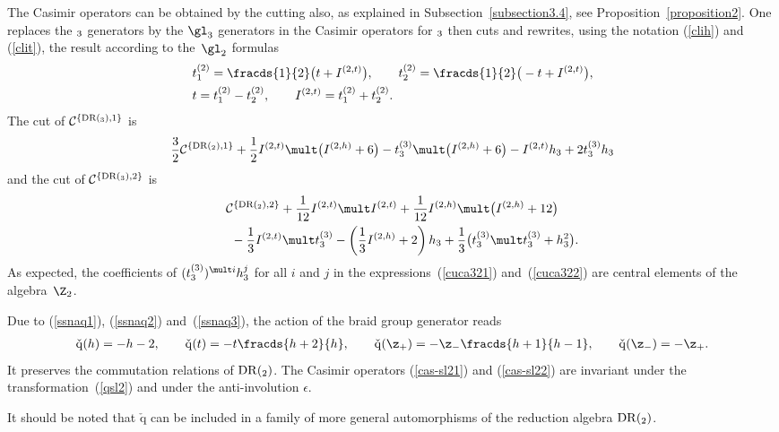 \documentclass[pdftex]{sigma}
\def\q{\check{\mathrm q}}\def\Q{\mathrm{Q}}\def\r#1{(\ref{#1})}\let\rf=\r
\numberwithin{equation}{section}
\begin{document}
The Casimir operators can be obtained by the cutting also, as explained in Subsection~\ref{subsection3.4}, see Proposition~\ref{proposition2}.
One replaces the  $\sl_3$ generators by the $\gl_3$ generators in the Casimir operators
for $\sl_3$ then cuts and rewrites, using the notation \rf{clih} and \rf{clit}, the result according to the~$\gl_2$ formulas
\begin{gather*}
\begin{split}
& t_1^{(2)}= \fracds{1}{2}\big(t +I^{(2,t)}\big)  ,\qquad t_2^{(2)}=  \fracds{1}{2}\big(-t +I^{(2,t)}\big)  ,\\
& t=t_1^{(2)}-t_2^{(2)} ,\qquad I^{(2,t)}=t_1^{(2)}+t_2^{(2)}  .
\end{split}
\end{gather*}
The cut of ${\mathcal{C}}^{\{ {\mathrm{DR}}(\sl_3),1\} }$ is
\begin{gather}
\frac{3}{2}{\mathcal{C}}^{\{ {\mathrm{DR}}(\sl_2),1\} } + \frac{1}{2}I^{(2,t)}\mult\bigl( I^{(2,h)}+6\bigr)
  -t_3^{(3)}\mult\bigl( I^{(2,h)}+6\bigr)-I^{(2,t)}h_3+2t_3^{(3)}h_3   \label{cuca321}
\end{gather}
and the cut of ${\mathcal{C}}^{\{ {\mathrm{DR}}(\sl_3),2\} }$ is
\begin{gather}
{\mathcal{C}}^{\{ {\mathrm{DR}}(\sl_2),2\} } + \frac{1}{12}I^{(2,t)}\mult I^{(2,t)}+ \frac{1}{12}{I^{(2,h)}}\mult\bigl( I^{(2,h)}+12\bigr)\nonumber\\
\qquad{} - \frac{1}{3}I^{(2,t)}\mult t_3^{(3)}-\left(  \frac{1}{3}I^{(2,h)}+2\right) h_3+\dfrac{1}{3}\bigl(
t_3^{(3)}\mult t_3^{(3)} +h_3^2\bigr)  .  \label{cuca322}
\end{gather}
As expected, the coef\/f\/icients of $(t_3^{(3)})^{\mult i}  h_3^j$ for all $i$ and $j$ in the expressions~(\ref{cuca321}) and~(\ref{cuca322}) are central
elements of the algebra~$\Z_2$.


Due to \rf{ssnaq1},  \rf{ssnaq2} and~\rf{ssnaq3},  the action of the braid group generator reads
\begin{gather}\label{qsl2}   \q (h)=-h-2  ,\qquad
\q (t)=-t  \fracds{h+2}{h}  ,\qquad
\q (\z_{+} )=-\z_{-}  \fracds{h+1}{h-1} ,\qquad
\q  (\z_{-} )=-\z_{+}  .\end{gather}
It preserves the commutation relations of ${\mathrm{DR}}(\sl_2)$. The Casimir operators \rf{cas-sl21} and \rf{cas-sl22} are invariant under the transformation~\rf{qsl2} and under the anti-involution $\epsilon$.


It should be noted that $\q$ can be included in a family of more general automorphisms of the reduction algebra ${\mathrm{DR}}(\sl_2)$.
\end{document}
